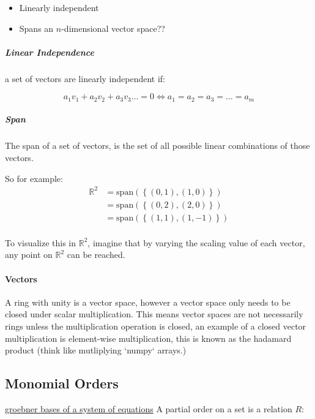 \documentclass[a4paper,11pt,twoside]{article}
\begin{document}
\begin{itemize}
\item Linearly independent
\item Spans an \(n\)-dimensional vector space??
\end{itemize}
\subparagraph{Linear Independence}
\label{sec:org6448a14}
a set of vectors are linearly independent if:

\[
      a_{1}v_{1}+a_{2}v_{2}+a_{3}v_{3}\ldots=0 \iff a_{1}=a_{2}=a_{3}=\ldots=a_{m}
      \]
\subparagraph{Span}
\label{sec:orgbadae51}
The span of a set of vectors, is the set of all possible linear
combinations of those vectors.

So for example:
\begin{align}
\mathbb{R}^2&=\mathrm{span}\left( \left\{\left(0,1\right), \left(1, 0\right)\right\}  \right)\\
	    &=\mathrm{span}\left( \left\{\left(0,2\right), \left(2, 0\right)\right\}  \right)\\
	    &=\mathrm{span}\left( \left\{\left(1,1\right), \left(1, -1\right)\right\}  \right)\\
\end{align}

To visualize this in \(\mathbb{R}^2\), imagine that by varying
the scaling value of each vector, any point on \(\mathbb{R}^2\)
can be reached.

\paragraph{Vectors}
\label{sec:org1f848e4}
A ring with unity is a vector space, however a vector space only
needs to be closed under scalar multiplication. This means
vector spaces are not necessarily rings unless the
multiplication operation is closed, an example of a closed
vector multiplication is element-wise multiplication, this is
known as the hadamard product (think like mutliplying `numpy` arrays.)
\subsection{Monomial Orders}
\label{sec:org5a0a339}
    \href{20210406222024-groebner\_bases\_of\_a\_system\_of\_equations.org}{groebner bases of a system of equations}
A partial order on a set is a relation \(R\):
\end{document}
